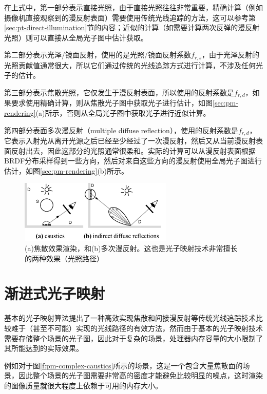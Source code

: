 在上式中，第一部分表示直接光照，由于直接光照往往非常重要，精确计算（例如摄像机直接观察到的漫反射表面）需要使用传统光线追踪的方法，这可以参考第\ref{sec:pt-direct-illumination}节的内容；近似的计算（如需要计算两次反弹的漫反射光照）则可以直接从全局光子图中估计获取。

第二部分表示光泽/镜面反射，使用的是光照/镜面反射系数$f_{r,s}$，由于光泽反射的光照贡献值通常很大，所以它们通过传统的光线追踪方式进行计算，不涉及任何光子的估计。

第三部分表示焦散光照，它仅发生于漫反射表面，所以使用的反射系数是$f_{r,d}$，如果要求使用精确计算，则从焦散光子图中获取光子进行估计，如图\ref{sec:pm-rendering}(a)所示，否则从全局光子图中获取光子进行近似计算。

第四部分表面多次漫反射（multiple diffuse reflection），使用的反射系数是$f_{r,d}$，它表示入射光从离开光源之后已经至少经过了一次漫反射，然后又从当前漫反射表面反射出去，因此这部分的光照通常很柔和。实际的计算可以从漫反射表面根据BRDF分布采样得到一些方向，然后对来自这些方向的漫反射使用全局光子图进行估计，如图\ref{sec:pm-rendering}(b)所示。

\begin{figure}
	\sidecaption
	\includegraphics[width=0.65\textwidth]{figures/pm/rendering}
	\caption{(a)焦散效果渲染，和(b)多次漫反射。这也是光子映射技术非常擅长的两种效果（光照路径）}
	\label{f:pm-rendering}
\end{figure}







\section{渐进式光子映射}\label{sec:pm-progressive-pm}
基本的光子映射算法提出了一种高效实现焦散和间接漫反射等传统光线追踪技术比较难于（甚至不可能）实现的光线路径的有效方法，然而由于基本的光子映射技术需要存储整个场景的光子图，因此对于复杂的场景，处理器内存容量的大小限制了其所能达到的实际效果。

例如对于图\ref{f:pm-complex-caustics}所示的场景，这是一个包含大量焦散面的场景，因此整个场景的光子图需要非常高的密度才能避免比较明显的噪点，这时渲染的图像质量就很大程度上依赖于可用的内存大小。

